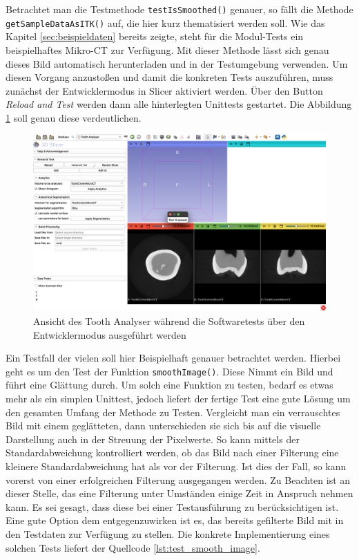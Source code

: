 Betrachtet man die Testmethode \texttt{testIsSmoothed()} genauer, so fällt die
Methode \texttt{getSampleDataAsITK()} auf, die hier kurz thematisiert werden
soll. Wie das Kapitel \ref{sec:beispieldaten} bereits zeigte, steht für die
Modul-Tests ein beispielhaftes Mikro-CT zur Verfügung. Mit dieser Methode lässt sich
genau dieses Bild automatisch herunterladen und in der Testumgebung verwenden.
Um diesen Vorgang anzustoßen und damit die konkreten Tests auszuführen, muss zunächst
der Entwicklermodus in Slicer aktiviert werden. Über den Button \textit{Reload
and Test} werden dann alle hinterlegten Unittests gestartet. Die Abbildung
\ref{fig:tests} soll genau diese verdeutlichen.

\begin{figure}[h]
	\centering
	\includegraphics[width=1\textwidth]{img/toothAnalyser_test.png}
	\caption{Ansicht des Tooth Analyser während die Softwaretests über den
	Entwicklermodus ausgeführt werden}
	\label{fig:tests}
\end{figure}

Ein Testfall der vielen soll hier Beispielhaft genauer betrachtet werden.
Hierbei geht es um den Test der Funktion \texttt{smoothImage()}. Diese Nimmt ein
Bild und führt eine Glättung durch. Um solch eine Funktion zu testen, bedarf es
etwas mehr als ein simplen Unittest, jedoch liefert der fertige Test eine gute Lösung
um den gesamten Umfang der Methode zu Testen. Vergleicht man ein verrauschtes
Bild mit einem geglätteten, dann unterschieden sie sich bis auf die visuelle Darstellung
auch in der Streuung der Pixelwerte. So kann mittels der Standardabweichung
kontrolliert werden, ob das Bild nach einer Filterung eine kleinere Standardabweichung
hat als vor der Filterung. Ist dies der Fall, so kann vorerst von einer erfolgreichen
Filterung ausgegangen werden. Zu Beachten ist an dieser Stelle, das eine Filterung
unter Umständen einige Zeit in Anspruch nehmen kann. Es sei gesagt, dass diese bei
einer Testausführung zu berücksichtigen ist. Eine gute Option dem
entgegenzuwirken ist es, das bereits gefilterte Bild mit in den Testdaten zur Verfügung
zu stellen. Die konkrete Implementierung eines solchen Tests liefert der
Quellcode \ref{lst:test_smooth_image}.

